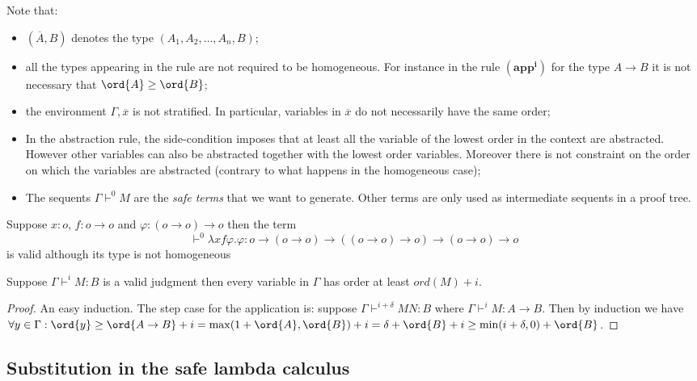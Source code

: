 Note that:
\begin{itemize}
\item $(\overline{A},B)$ denotes the type $(A_1,A_2, \ldots, A_n, B)$;
\item all the types appearing in the rule are not required to be homogeneous. For instance in the rule $\mathbf{(app^i)}$ for the type $A \rightarrow B$
it is not necessary that $\ord{A} \geq \ord{B}$;
\item the environment $\Gamma, \overline{x}$ is not stratified. In particular, variables in $\overline{x}$ do not necessarily have the same
order;
\item In the abstraction rule, the side-condition imposes that at least all the variable of the lowest order
in the context are abstracted. However other variables can also be
abstracted together with the lowest order variables. Moreover there
is not constraint on the order on which the variables are abstracted
(contrary to what happens in the homogeneous case);
\item The sequents $\Gamma \vdash^0 M$ are the \emph{safe terms} that we want to generate.
Other terms are only used as intermediate sequents in a proof tree.
\end{itemize}

\begin{exmp}
Suppose $x:o$, $f:o\rightarrow o$ and $\varphi:(o\rightarrow
o)\rightarrow o$ then the term $$\vdash^0 \lambda x f \varphi .
\varphi : o \rightarrow (o\rightarrow o) \rightarrow ((o\rightarrow
o)\rightarrow o) \rightarrow (o\rightarrow o)\rightarrow o$$ is
valid although its type is not homogeneous
\end{exmp}


\begin{lem}
\label{va_lem:nonhomosafe_basic_prop} Suppose $\Gamma \vdash^i M : B$
is a valid judgment then every variable in $\Gamma$ has order at
least $ord(M)+i$.
\end{lem}
\begin{proof}
An easy induction. The step case for the application is: suppose
$\Gamma \vdash^{i+\delta} M N : B$ where $\Gamma \vdash^i M :
A\rightarrow B$. Then by induction we have $\forall y \in \Gamma :
\ord{y} \geq \ord{A\rightarrow B} + i = \max(1+\ord{A}, \ord{B})+i =
\delta + \ord{B} + i \geq \min(i+\delta,0) + \ord{B}$.
\end{proof}

\subsection{Substitution in the safe lambda calculus}

